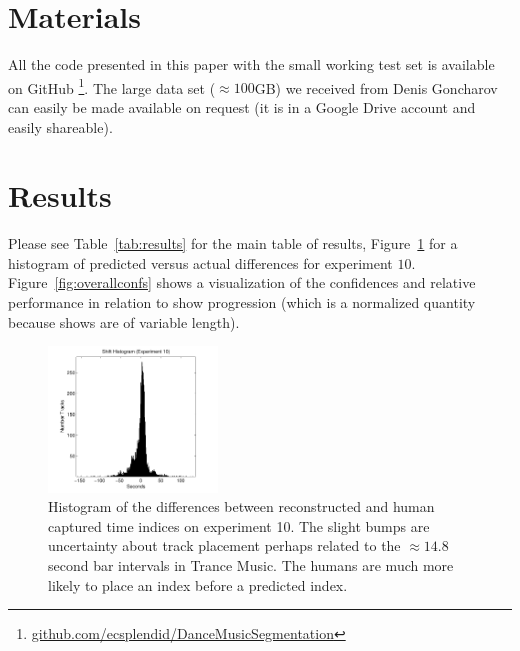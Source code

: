 \documentclass[twocolumn]{article}
\begin{document}
\section{Materials}\label{sec:materials}

All the code presented in this paper with the small working test set is available on GitHub \footnote{\url{github.com/ecsplendid/DanceMusicSegmentation}}. The large data set ($\approx100$GB) we received from Denis Goncharov can easily be made available on request (it is in a Google Drive account and easily shareable).

\section{Results}\label{sec:results}

Please see Table~\ref{tab:results} for the main table of results, Figure~\ref{fig:shifthistogram} for a histogram of predicted versus actual differences for experiment $10$. Figure~\ref{fig:overallconfs} shows a visualization of the confidences and relative performance in relation to show progression (which is a normalized quantity because shows are of variable length).

	\begin{figure}
		\centering
		\includegraphics[width=0.4\textwidth]{images/shift_histogram}
		\caption{Histogram of the differences between reconstructed and human captured time indices on experiment 10. The slight bumps are uncertainty about track placement perhaps related to the $\approx 14.8$ second bar intervals in Trance Music. The humans are much more likely to place an index before a predicted index.  }
		\label{fig:shifthistogram}
	\end{figure} 
\end{document}
